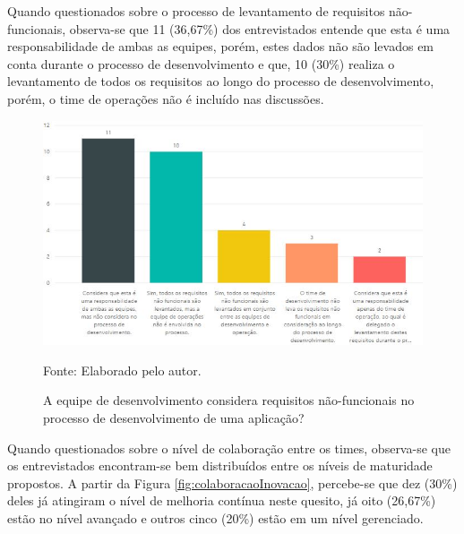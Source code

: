 \documentclass[twoside,english,brazilian]{UNISINOSartigo}
\newcommand{\source}[1]{\caption*{Fonte: {#1}} }
\begin{document}
Quando questionados sobre o processo de levantamento de requisitos não-funcionais, observa-se que 11 (36,67\%) dos entrevistados entende que esta é uma responsabilidade de ambas as equipes, porém, estes dados não são levados em conta durante o processo de desenvolvimento e que, 10 (30\%) realiza o levantamento de todos os requisitos ao longo do processo de desenvolvimento, porém, o time de operações não é incluído nas discussões. 
\begin{figure}[H]
    \centering
    \caption{A equipe de desenvolvimento considera requisitos não-funcionais no processo de desenvolvimento de uma aplicação?}
       \includegraphics[scale=.6]{imagens/requisitos.JPG}
        \source{Elaborado pelo autor.}
    \label{fig:requisitos}
\end{figure}

Quando questionados sobre o nível de colaboração entre os times, observa-se que os entrevistados encontram-se bem distribuídos entre os níveis de maturidade propostos. A partir da Figura \ref{fig:colaboracaoInovacao}, percebe-se que dez (30\%) deles já atingiram o nível de melhoria contínua neste quesito, já oito (26,67\%) estão no nível avançado e outros cinco (20\%) estão em um nível gerenciado. 
\end{document}
